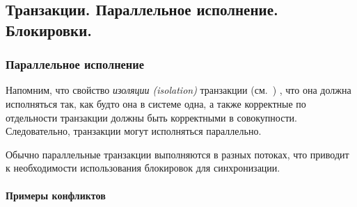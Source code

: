\subsection{Транзакции. Параллельное исполнение. Блокировки.}

\subsubsection{Параллельное исполнение}

Напомним, что свойство \textit{изоляции (isolation)} транзакции (см.~) , что она
должна исполняться так, как будто она в системе одна, а также корректные по отдельности транзакции
должны быть корректными в совокупности. Следовательно, транзакции могут исполняться параллельно.

Обычно параллельные транзакции выполняются в разных потоках, что приводит к необходимости
использования блокировок для синхронизации.

\paragraph{Примеры конфликтов}


